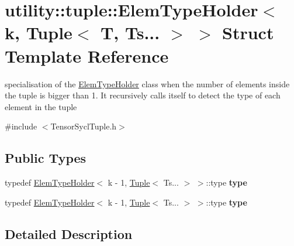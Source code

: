 \hypertarget{structutility_1_1tuple_1_1_elem_type_holder_3_01k_00_01_tuple_3_01_t_00_01_ts_8_8_8_01_4_01_4}{}\section{utility\+:\+:tuple\+:\+:Elem\+Type\+Holder$<$ k, Tuple$<$ T, Ts... $>$ $>$ Struct Template Reference}
\label{structutility_1_1tuple_1_1_elem_type_holder_3_01k_00_01_tuple_3_01_t_00_01_ts_8_8_8_01_4_01_4}


specialisation of the \hyperlink{structutility_1_1tuple_1_1_elem_type_holder}{Elem\+Type\+Holder} class when the number of elements inside the tuple is bigger than 1. It recursively calls itself to detect the type of each element in the tuple  




{\ttfamily \#include $<$Tensor\+Sycl\+Tuple.\+h$>$}

\subsection*{Public Types}
\begin{DoxyCompactItemize}
\item 
\mbox{\label{structutility_1_1tuple_1_1_elem_type_holder_3_01k_00_01_tuple_3_01_t_00_01_ts_8_8_8_01_4_01_4_aae77b02176214f3c79ac34dd4e7dd630}} 
typedef \hyperlink{structutility_1_1tuple_1_1_elem_type_holder}{Elem\+Type\+Holder}$<$ k -\/ 1, \hyperlink{structutility_1_1tuple_1_1_tuple}{Tuple}$<$ Ts... $>$ $>$\+::type {\bfseries type}
\item 
\mbox{\label{structutility_1_1tuple_1_1_elem_type_holder_3_01k_00_01_tuple_3_01_t_00_01_ts_8_8_8_01_4_01_4_aae77b02176214f3c79ac34dd4e7dd630}} 
typedef \hyperlink{structutility_1_1tuple_1_1_elem_type_holder}{Elem\+Type\+Holder}$<$ k -\/ 1, \hyperlink{structutility_1_1tuple_1_1_tuple}{Tuple}$<$ Ts... $>$ $>$\+::type {\bfseries type}
\end{DoxyCompactItemize}


\subsection{Detailed Description}
